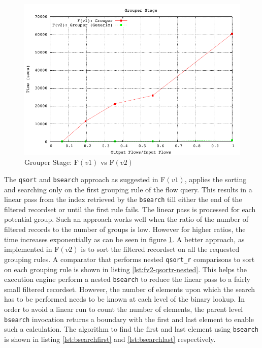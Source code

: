 \begin{figure}[h!]
  \begin{center}
    \includegraphics*
    [width=0.8\linewidth]{figures/benchmarks/grouper-fv1-fv2-bsearch}
    \caption{Grouper Stage: F$(v1)$ vs F$(v2)$}
    \label{fig:fv1-fv2-grouper-bsearch}
  \end{center}
\end{figure}

The \texttt{qsort} and \texttt{bsearch} approach as suggested in F$(v1)$,
applies the sorting and searching only on the first grouping rule of the flow
query. This results in a linear pass from the index retrieved by the
\texttt{bsearch} till either the end of the filtered recordset or until the
first rule fails. The linear pass is processed for each potential group. Such
an approach works well when  the
ratio of the number of filtered records to the number of groups is low.
However for higher ratios, the time increases exponentially as can be seen in
figure \ref{fig:fv1-fv2-grouper-bsearch}. A better approach, as implemented in
F$(v2)$ is to sort the filtered recordset on all the requested grouping rules.
A comparator that performs nested \texttt{qsort\_r} comparisons to sort on
each grouping rule is shown in listing \ref{lst:fv2-qsortr-nested}. This helps
the execution engine perform a nested \texttt{bsearch} to reduce the linear
pass to a fairly small filtered recordset. However, the number of elements
upon which the search has to be performed needs to be known at each level of
the binary lookup. In order to avoid a linear run to count the number of
elements, the parent level \texttt{bsearch} invocation returns a boundary with
the first and last element to enable such a calculation. The algorithm to find
the first and last element using \texttt{bsearch} is shown in listing
\ref{lst:bsearchfirst} and \ref{lst:bsearchlast} respectively.


